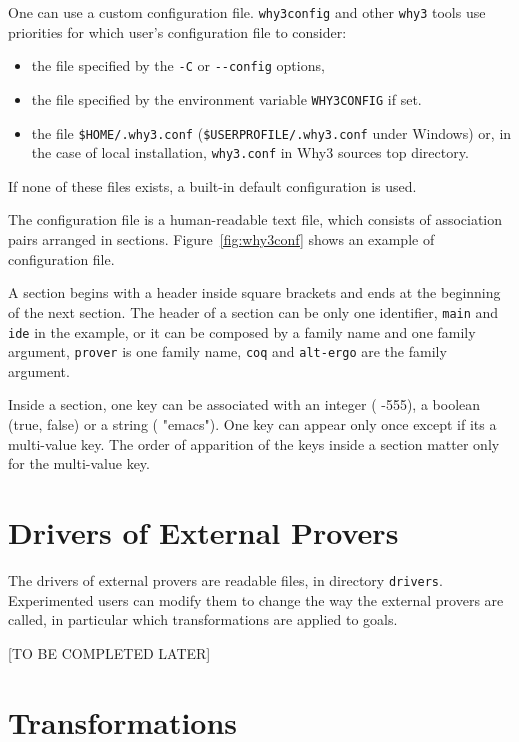One can use a custom configuration file. \texttt{why3config}
and other \texttt{why3} tools use priorities for which
user's configuration file to consider:
\begin{itemize}
\item the file specified by the \texttt{-C} or \texttt{-{}-config} options,
\item the file specified by the environment variable
  \texttt{WHY3CONFIG} if set.
\item the file \texttt{\$HOME/.why3.conf}
  (\texttt{\$USERPROFILE/.why3.conf} under Windows) or, in the case of
  local installation, \texttt{why3.conf} in Why3 sources top directory.
\end{itemize}
If none of these files exists, a built-in default configuration is used.

The configuration file is a human-readable text file, which consists
of association pairs arranged in sections. Figure~\ref{fig:why3conf}
shows an example of configuration file.

A section begins with a header inside square brackets and ends at the
beginning of the next section. The header of a
section can be only one identifier, \texttt{main} and \texttt{ide} in
the example, or it can be composed by a family name and one family
argument, \texttt{prover} is one family name, \texttt{coq} and
\texttt{alt-ergo} are the family argument.

Inside a section, one key can be associated with an integer (\eg{} -555),
a boolean (true, false) or a string (\eg{} "emacs"). One key can appear
only once except if its a multi-value key. The order of apparition of
the keys inside a section matter only for the multi-value key.

\section{Drivers of External Provers}
\label{sec:drivers}

The drivers of external provers are readable files, in directory
\texttt{drivers}. Experimented users can modify them to change the way
the external provers are called, in particular which transformations
are applied to goals.

[TO BE COMPLETED LATER]

\section{Transformations}
\label{sec:transformations}

